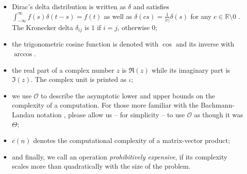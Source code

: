 \begin{itemize}
    \item Dirac's delta distribution is written as $\delta$ and satisfies
          $\int_{-\infty}^{\infty} f(s)\delta(t-s) = f(t)$ as well as
          $\delta(cs)=\frac{1}{|c|}\delta(s)$ for any $c \in \mathbb{R} \setminus {0}$ \cite[chapter~15]{dirac1947quantum}.
          The Kronecker delta $\delta_{ij}$ is $1$ if $i=j$, otherwise $0$;
    \item the trigonometric cosine function is denoted with $\cos$ and its inverse with $\arccos$.
    \item the real part of a complex number $z$ is $\Re(z)$ while its imaginary part is $\Im(z)$.
          The complex unit is printed as $\iota$;
    \item we use $\mathcal{O}$ to describe the asymptotic lower and upper bounds
          on the complexity of a computation. For those more familiar with the
          Bachmann-Landau notation \cite[section~3.2]{cormen2009algorithms},
          please allow us -- for simplicity -- to use $\mathcal{O}$ as though it was $\Theta$;
    \item $c(n)$ denotes the computational complexity of a matrix-vector product;
    \item and finally, we call an operation \emph{prohibitively expensive}, if its
          complexity scales more than quadratically with the size of the problem.
\end{itemize}
